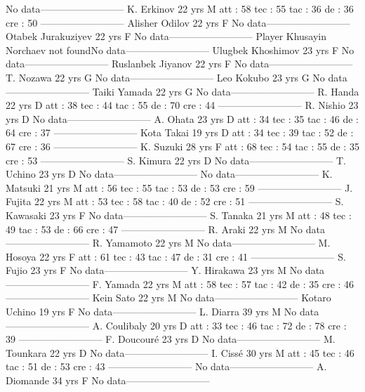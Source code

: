 No data--------------------------
K. Erkinov  22 yrs 
M 
 att : 58 
 tec : 55 
 tac : 36 
 de : 36 
 cre : 50 
--------------------------
Alisher Odilov  22 yrs 
F 
No data--------------------------
Otabek Jurakuziyev  22 yrs 
F 
No data--------------------------
Player Khusayin Norchaev not foundNo data--------------------------
Ulugbek Khoshimov  23 yrs 
F 
No data--------------------------
Ruslanbek Jiyanov  22 yrs 
F 
No data--------------------------
T. Nozawa  22 yrs 
G 
No data--------------------------
Leo Kokubo  23 yrs 
G 
No data--------------------------
Taiki Yamada  22 yrs 
G 
No data--------------------------
R. Handa  22 yrs 
D 
 att : 38 
 tec : 44 
 tac : 55 
 de : 70 
 cre : 44 
--------------------------
R. Nishio  23 yrs 
D 
No data--------------------------
A. Ohata  23 yrs 
D 
 att : 34 
 tec : 35 
 tac : 46 
 de : 64 
 cre : 37 
--------------------------
Kota Takai  19 yrs 
D 
 att : 34 
 tec : 39 
 tac : 52 
 de : 67 
 cre : 36 
--------------------------
K. Suzuki  28 yrs 
F 
 att : 68 
 tec : 54 
 tac : 55 
 de : 35 
 cre : 53 
--------------------------
S. Kimura  22 yrs 
D 
No data--------------------------
T. Uchino  23 yrs 
D 
No data--------------------------
No data--------------------------
K. Matsuki  21 yrs 
M 
 att : 56 
 tec : 55 
 tac : 53 
 de : 53 
 cre : 59 
--------------------------
J. Fujita  22 yrs 
M 
 att : 53 
 tec : 58 
 tac : 40 
 de : 52 
 cre : 51 
--------------------------
S. Kawasaki  23 yrs 
F 
No data--------------------------
S. Tanaka  21 yrs 
M 
 att : 48 
 tec : 49 
 tac : 53 
 de : 66 
 cre : 47 
--------------------------
R. Araki  22 yrs 
M 
No data--------------------------
R. Yamamoto  22 yrs 
M 
No data--------------------------
M. Hosoya  22 yrs 
F 
 att : 61 
 tec : 43 
 tac : 47 
 de : 31 
 cre : 41 
--------------------------
S. Fujio  23 yrs 
F 
No data--------------------------
Y. Hirakawa  23 yrs 
M 
No data--------------------------
F. Yamada  22 yrs 
M 
 att : 58 
 tec : 57 
 tac : 42 
 de : 35 
 cre : 46 
--------------------------
Kein Sato  22 yrs 
M 
No data--------------------------
Kotaro Uchino  19 yrs 
F 
No data--------------------------
L. Diarra  39 yrs 
M 
No data--------------------------
A. Coulibaly  20 yrs 
D 
 att : 33 
 tec : 46 
 tac : 72 
 de : 78 
 cre : 39 
--------------------------
F. Doucouré  23 yrs 
D 
No data--------------------------
M. Tounkara  22 yrs 
D 
No data--------------------------
I. Cissé  30 yrs 
M 
 att : 45 
 tec : 46 
 tac : 51 
 de : 53 
 cre : 43 
--------------------------
No data--------------------------
A. Diomande  34 yrs 
F 
No data--------------------------
